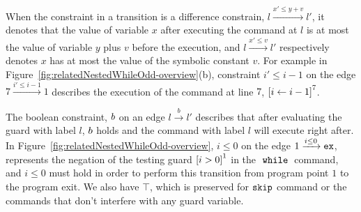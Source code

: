 When the constraint in a transition is a difference constrain, $l \xrightarrow{x' \leq y + v} l'$,
it denotes that
the value of variable $x$
after executing the command at $l$ is at most
the value of variable $y$ plus $v$ before the execution,
and $l \xrightarrow{x' \leq v} l'$ respectively denotes
$x$ has at most
the value of the symbolic constant $v$.
For example in Figure~\ref{fig:relatedNestedWhileOdd-overview}(b), constraint $i' \leq i - 1$ on the edge $7 \xrightarrow{i' \leq i - 1} 1$
describes the execution of
 the command at line $7$, 
$\clabel{\assign{i}{i - 1}}^{7}$. 


The boolean constraint, $b$ on an edge $l \xrightarrow{b} l'$ describes
that after evaluating the guard with label $l$,
$b$ holds and the command with label $l$ will execute right after.
In Figure~\ref{fig:relatedNestedWhileOdd-overview}, $i \leq 0 $ on the edge $1 \xrightarrow{i \leq 0} \mathtt{ex}$, 
represents the negation of the testing guard $\clabel{i > 0}^1$
in the $\;\mathtt{while}\;$ command, and $i \leq 0$ must hold in order to perform this transition from program point $1$ to
the program exit. 
We also have $\top$, which is preserved for $\mathtt{skip}$ command or the commands that don't interfere with any guard variable.



